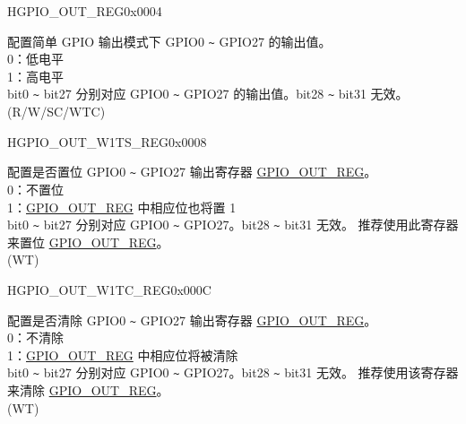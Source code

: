 

\begin{register}{H}{GPIO\_OUT\_REG}{0x0004}\label{regdesc:GPIOOUTREG}
%
\regnewline%
\begin{regdesc}\begin{reglist}
\label{fielddesc:GPIOOUTDATAORIG}\item [GPIO\_OUT\_DATA\_ORIG] 配置简单 GPIO 输出模式下 GPIO0 \verb+~+ GPIO27 的输出值。 \\
0：低电平\\
1：高电平\\
bit0 \verb+~+ bit27 分别对应 GPIO0 \verb+~+ GPIO27 的输出值。bit28 \verb+~+ bit31 无效。\\
(R/W/SC/WTC)
\end{reglist}\end{regdesc}
\end{register}


\begin{register}{H}{GPIO\_OUT\_W1TS\_REG}{0x0008}\label{regdesc:GPIOOUTW1TSREG}
%
\regnewline%
\begin{regdesc}\begin{reglist}
\label{fielddesc:GPIOOUTW1TS}\item [GPIO\_OUT\_W1TS] 配置是否置位 GPIO0 \verb+~+ GPIO27 输出寄存器 \hyperref[regdesc:GPIOOUTREG]{GPIO\_OUT\_REG}。\\
0：不置位\\
1：\hyperref[regdesc:GPIOOUTREG]{GPIO\_OUT\_REG} 中相应位也将置 1\\
bit0 \verb+~+ bit27 分别对应 GPIO0 \verb+~+ GPIO27。bit28 \verb+~+ bit31 无效。
推荐使用此寄存器来置位 \hyperref[regdesc:GPIOOUTREG]{GPIO\_OUT\_REG}。\\
(WT)
\end{reglist}\end{regdesc}
\end{register}


\begin{register}{H}{GPIO\_OUT\_W1TC\_REG}{0x000C}\label{regdesc:GPIOOUTW1TCREG}
%
\regnewline%
\begin{regdesc}\begin{reglist}
\label{fielddesc:GPIOOUTW1TC}\item [GPIO\_OUT\_W1TC] 配置是否清除 GPIO0 \verb+~+ GPIO27 输出寄存器 \hyperref[regdesc:GPIOOUTREG]{GPIO\_OUT\_REG}。\\
0：不清除\\
1：\hyperref[regdesc:GPIOOUTREG]{GPIO\_OUT\_REG} 中相应位将被清除\\
bit0 \verb+~+ bit27 分别对应 GPIO0 \verb+~+ GPIO27。bit28 \verb+~+ bit31 无效。
推荐使用该寄存器来清除 \hyperref[regdesc:GPIOOUTREG]{GPIO\_OUT\_REG}。\\
(WT)
\end{reglist}\end{regdesc}
\end{register}


